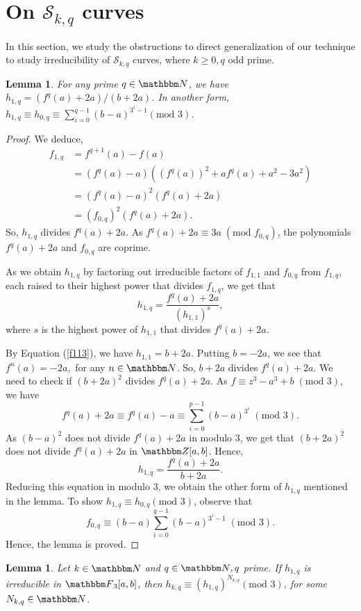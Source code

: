 \documentclass[reqno]{amsart}
\renewcommand{\eqref}[1]{(\ref{#1})}
\numberwithin{equation}{section}
\theoremstyle{plain}
\newtheorem{lemma}[theorem]{Lemma}
\theoremstyle{definition}
\theoremstyle{definition}
\newcommand{\Z}{{\mathbbm Z}}
\newcommand{\N}{{\mathbbm N}}
\newcommand{\F}{{\mathbbm F}}
\begin{document}
\section{On $\mathscr{S}_{k,q}$ curves}\label{kqcurves}
In this section, we study the obstructions to direct generalization of our technique to study irreducibility of $\mathscr{S}_{k,q}$ curves, where $k\geq 0, q$ odd prime.
    \begin{lemma}
        For any prime $q\in \N$, we have $h_{1,q}=(f^{q}(a)+2a)/(b+2a)$. In another form, $h_{1,q}\equiv h_{0,q} \equiv \sum_{i=0}^{q-1}(b-a)^{3^{i}-1} (\text{mod }3)$.
    \end{lemma}
    \begin{proof}
        We deduce,
        \begin{align*}
            f_{1,q} & =f^{q+1}(a)-f(a)\\
            & =(f^{q}(a)-a) \left((f^{q}(a))^{2}+af^{q}(a)+a^{2}-3a^{2}\right)\\
            & =(f^{q}(a)-a)^{2} (f^{q}(a)+2a)\\ 
            & = (f_{0,q})^{2} (f^{q}(a)+2a).
        \end{align*}
        So, $h_{1,q}$ divides $f^{q}(a)+2a$. As $f^{q}(a)+2a\equiv 3a\;(\text{mod }f_{0,q})$, the polynomials$f^{q}(a)+2a$  and $f_{0,q}$ are coprime.

        As we obtain $h_{1,q}$ by factoring out irreducible factors of $f_{1,1}$ and $f_{0,q}$ from $f_{1,q}$, each raised to their highest power that divides $f_{1,q}$, we get that $$h_{1,q}= \frac{f^{q}(a)+2a}{(h_{1,1})^{s}},$$ where $s$ is the highest power of $h_{1,1}$ that divides $f^{q}(a)+2a$. 


        By Equation \eqref{f113}, we have $h_{1,1}=b+2a$. Putting $b=-2a$, we see that $f^{n}(a)=-2a, $ for any $ n\in \N$. So, $b+2a$ divides $f^{q}(a)+2a$. We need to check if $(b+2a)^{2}$ divides $f^{q}(a)+2a$. As $f\equiv z^{3}-a^{3} +b \;(\text{mod } 3)$, we have $$f^{q}(a)+2a \equiv f^{q}(a)-a\equiv \sum_{i=0}^{p-1} (b-a)^{3^{i}}\;(\text{mod }3).$$ As $(b-a)^{2}$ does not divide $f^{q}(a)+2a$ in modulo $3$, we get that $(b+2a)^{2}$ does not divide $f^{q}(a)+2a$ in $\Z[a,b]$. Hence, $$h_{1,q}=\frac{f^{q}(a)+2a}{b+2a}.$$ Reducing this equation in modulo $3$, we obtain the other form of $h_{1,q}$ mentioned in the lemma. To show $h_{1,q}\equiv h_{0,q}(\text{mod }3)$, observe that $$f_{0,q}\equiv (b-a) \sum_{i=0}^{q-1} (b-a)^{3^{i}-1}\;(\text{mod }3).$$ Hence, the lemma is proved. 
    \end{proof}
    \begin{lemma}
        Let $k\in \N $ and $q\in \N, q$ prime. If $h_{1,q}$ is irreducible in $\F_{3}[a,b]$, then $h_{k,q}\equiv (h_{1,q})^{N_{k,q}}(\text{mod }3)$, for some $N_{k,q}\in \N$.
    \end{lemma}
\end{document}
